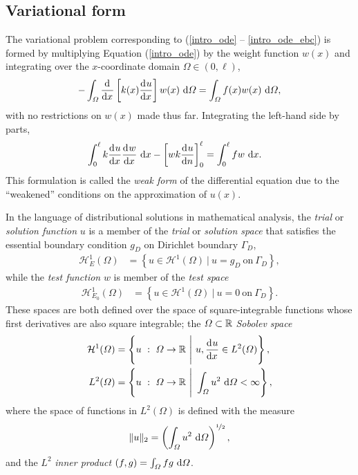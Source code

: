 \subsection{Variational form} \label{ssn_variational_form}

The variational problem  corresponding to (\ref{intro_ode} -- \ref{intro_ode_ebc}) is formed by multiplying Equation (\ref{intro_ode}) by the weight function $w(x)$ and integrating over the $x$-coordinate domain $\Omega \in (0,\ell)$,
$$-\int_{\varOmega} \frac{\mathrm{d}^{} }{\mathrm{d} x^{} } \left[ k(x) \frac{\mathrm{d}^{} u}{\mathrm{d} x^{} } \right] w(x) \ \mathrm{d}\varOmega = \int_{\varOmega} f(x) w(x) \ \mathrm{d}\varOmega,$$
with no restrictions on $w(x)$ made thus far.  Integrating the left-hand side by parts,
\begin{align*}
  \int_0^{\ell} k \frac{\mathrm{d}^{} u}{\mathrm{d} x^{} } \frac{\mathrm{d}^{} w}{\mathrm{d} x^{} } \ \mathrm{d}x - \left[ wk\frac{\mathrm{d}^{} u}{\mathrm{d} n^{} }\right]_0^{\ell} &= \int_0^{\ell} f w \ \mathrm{d}x.
\end{align*}
This formulation is called the \emph{weak form}  of the differential equation due to the ``weakened'' conditions on the approximation of $u(x)$.

In the language of distributional solutions in mathematical analysis, the  \emph{trial} or \emph{solution function} $u$ is a member of the \emph{trial} or \emph{solution space} that satisfies the essential boundary condition $g_D$ on Dirichlet boundary $\Gamma_D$,
\begin{align}
  \label{trial_space}
  \mathcal{H}_E^1(\Omega) &= \left\{ u \in \mathcal{H}^1(\Omega)\ |\ u = g_D\ \text{on}\ \Gamma_D \right\},
\end{align}
while the  \emph{test function} $w$ is member of the \emph{test space}
\begin{align}
  \label{test_space}
  \mathcal{H}_{E_0}^1(\Omega) &= \left\{ u \in \mathcal{H}^1(\Omega)\ |\ u = 0\ \text{on}\ \Gamma_D \right\}.
\end{align}
These spaces are both defined over the space of square-integrable functions whose first derivatives are also square integrable; the $\varOmega \subset \mathbb{R}$  \emph{Sobolev space} \citep{elman_2005}
\begin{align}
  \label{sobolev_space}
  \mathcal{H}^1(\Omega) &= \left\{ u\ :\ \Omega \rightarrow \R\ \Bigg|\ u, \totder{u}{x} \in L^2(\Omega) \right\},\\
  \label{l2_space}
  L^2(\Omega) &= \left\{ u\ :\ \Omega \rightarrow \R\ \Bigg|\ \int_{\Omega} u^2 \d{\Omega} < \infty \right\},
\end{align}
where the space of functions in  $L^2(\Omega)$ is defined with the measure
\begin{align}
  \label{l2_norm}
  \Vert u \Vert_2 = \left( \int_{\varOmega} u^2 \ \mathrm{d}\varOmega \right)^{\nicefrac{1}{2}},
\end{align}
and the  $L^2$ \emph{inner product} $(f,g) = \int_{\varOmega} f g \ \mathrm{d}\varOmega$.

